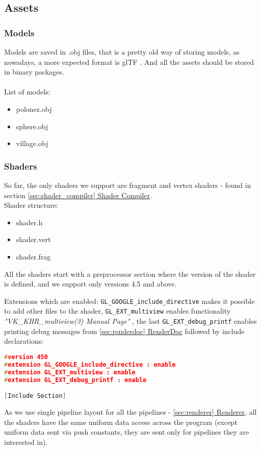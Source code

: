\newpage
\subsection{Assets}
\label{sec:assets}
\subsubsection{Models}
\hspace{\parindent}
Models are saved in .obj files, that is a pretty old way of storing models, as nowadays, a more expected format is glTF \cite{gltf}. And all the assets should be stored in binary packages.\\\\
List of models:
\begin{itemize}
    \item polonez.obj \cite{PolonezModel}
    \item sphere.obj
    \item village.obj \cite{VillageModel}
\end{itemize}
\subsubsection{Shaders}
\hspace{\parindent}
So far, the only shaders we support are fragment and vertex shaders - found in section \hyperref[sec:shader_compiler]{\ref*{sec:shader_compiler} Shader Compiler}.\\
Shader structure:
\begin{itemize}
    \item shader.h
    \item shader.vert
    \item shader.frag
\end{itemize}

All the shaders start with a preprocessor section where the version of the shader is defined, and we support only versions 4.5 and above.

Extensions which are enabled: \texttt{GL\_GOOGLE\_include\_directive} makes it possible to add other files to the shader, \texttt{GL\_EXT\_multiview} enables  functionality \textit{"VK\_KHR\_multiview(3) Manual Page"} \cite{multiview}, the last \texttt{GL\_EXT\_debug\_printf} enables printing debug messages from \hyperref[sec:renderdoc]{\ref*{sec:renderdoc} RenderDoc} followed by include declarations:
\begin{lstlisting}[language=c++, caption=Common shader preprocessor]
#version 450
#extension GL_GOOGLE_include_directive : enable
#extension GL_EXT_multiview : enable
#extension GL_EXT_debug_printf : enable

[Include Section]
\end{lstlisting}
\newpage
As we use single pipeline layout for all the pipelines - \hyperref[sec:renderer]{\ref*{sec:renderer} Renderer}, all the shaders have the same uniform data access across the program (except uniform data sent via push constants, they are sent only for pipelines they are interested in).

